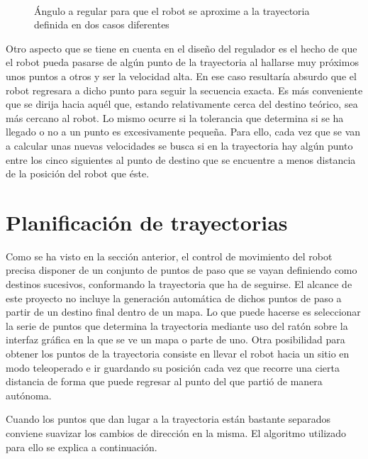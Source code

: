\begin{figure}[h]
    \\
  \caption{Ángulo a regular para que el robot se aproxime a la trayectoria definida en dos casos diferentes}\label{fg:regu}
\end{figure}

\clearpage
Otro aspecto que se tiene en cuenta en el diseño del regulador es el hecho de que el robot pueda pasarse de algún punto de la trayectoria al hallarse muy próximos unos puntos a otros y ser la velocidad alta. En ese caso resultaría absurdo que el robot regresara a dicho punto para seguir la secuencia exacta. Es más conveniente que se dirija hacia aquél que, estando relativamente cerca del destino teórico, sea más cercano al robot. Lo mismo ocurre si la tolerancia que determina si se ha llegado o no a un punto es excesivamente pequeña. Para ello, cada vez que se van a calcular unas nuevas velocidades se busca si en la trayectoria hay algún punto entre los cinco siguientes al punto de destino que se encuentre a menos distancia de la posición del robot que éste.

\section{Planificación de trayectorias}\label{tray}
Como se ha visto en la sección anterior, el control de movimiento del robot precisa disponer de un conjunto de puntos de paso que se vayan definiendo como destinos sucesivos, conformando la trayectoria que ha de seguirse. El alcance de este proyecto no incluye la generación automática de dichos puntos de paso a partir de un destino final dentro de un mapa. Lo que puede hacerse es seleccionar la serie de puntos que determina la trayectoria mediante uso del ratón sobre la interfaz gráfica en la que se ve un mapa o parte de uno. Otra posibilidad para obtener los puntos de la trayectoria consiste en llevar el robot hacia un sitio en modo teleoperado e ir guardando su posición cada vez que recorre una cierta distancia de forma que puede regresar al punto del que partió de manera autónoma.

Cuando los puntos que dan lugar a la trayectoria están bastante separados conviene suavizar los cambios de dirección en la misma. El algoritmo utilizado para ello se explica a continuación.

